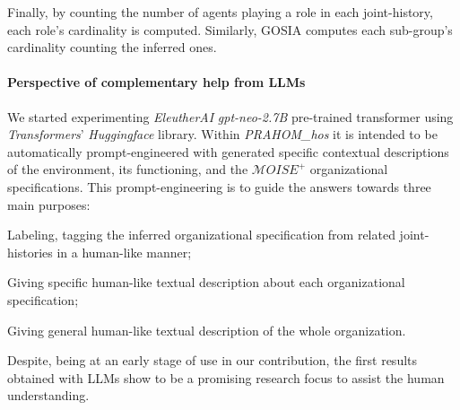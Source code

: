 \documentclass[doubleblind]{ecai}
\newcounter{relation}
\begin{document}
Finally, by counting the number of agents playing a role in each joint-history, each role's cardinality is computed. Similarly, GOSIA computes each sub-group's cardinality counting the inferred ones.

\paragraph{Perspective of complementary help from LLMs}

We started experimenting \emph{EleutherAI} \emph{gpt-neo-2.7B} pre-trained transformer using \emph{Transformers}' \emph{Huggingface} library. Within \emph{PRAHOM\_hos} it is intended to be automatically prompt-engineered with generated specific contextual descriptions of the environment, its functioning, and the $\mathcal{M}OISE^+$ organizational specifications. This prompt-engineering is to guide the answers towards three main purposes:
\begin{enumerate*}[label=\roman*),itemjoin={;\quad}]
    \item Labeling, tagging the inferred organizational specification from related joint-histories in a human-like manner;
    \item Giving specific human-like textual description about each organizational specification;
    \item Giving general human-like textual description of the whole organization.
\end{enumerate*}
Despite, being at an early stage of use in our contribution, the first results obtained with LLMs show to be a promising research focus to assist the human understanding.


%
%
%
%
\end{document}
